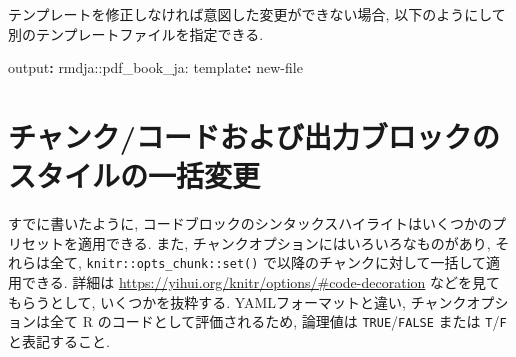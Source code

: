 \documentclass[
]{bxjsbook}
\newenvironment{Shaded}{\begin{snugshade}}{\end{snugshade}}
\newcommand{\AttributeTok}[1]{\textcolor[rgb]{0.77,0.63,0.00}{#1}}
\newcommand{\FunctionTok}[1]{\textcolor[rgb]{0.00,0.00,0.00}{#1}}
\newcommand{\KeywordTok}[1]{\textcolor[rgb]{0.13,0.29,0.53}{\textbf{#1}}}
\providecommand{\tightlist}{%
  \setlength{\itemsep}{0pt}\setlength{\parskip}{0pt}}
\theoremstyle{definition}
\theoremstyle{definition}
\theoremstyle{definition}
\theoremstyle{remark}
\begin{document}
テンプレートを修正しなければ意図した変更ができない場合,
以下のようにして別のテンプレートファイルを指定できる.

\begin{Shaded}
\begin{Highlighting}[]
\FunctionTok{output}\KeywordTok{:}\AttributeTok{ rmdja::pdf\_book\_ja:}
\AttributeTok{  }\FunctionTok{template}\KeywordTok{:}\AttributeTok{ new{-}file}
\end{Highlighting}
\end{Shaded}

\hypertarget{ux30c1ux30e3ux30f3ux30afux30b3ux30fcux30c9ux304aux3088ux3073ux51faux529bux30d6ux30edux30c3ux30afux306eux30b9ux30bfux30a4ux30ebux306eux4e00ux62ecux5909ux66f4}{%
\section{チャンク/コードおよび出力ブロックのスタイルの一括変更}\label{ux30c1ux30e3ux30f3ux30afux30b3ux30fcux30c9ux304aux3088ux3073ux51faux529bux30d6ux30edux30c3ux30afux306eux30b9ux30bfux30a4ux30ebux306eux4e00ux62ecux5909ux66f4}}

すでに書いたように,
コードブロックのシンタックスハイライトはいくつかのプリセットを適用できる.
また, チャンクオプションにはいろいろなものがあり, それらは全て,
\texttt{knitr::opts\_chunk::set()}
で以降のチャンクに対して一括して適用できる. 詳細は
\url{https://yihui.org/knitr/options/\#code-decoration}
などを見てもらうとして, いくつかを抜粋する. YAMLフォーマットと違い,
チャンクオプションは全て R のコードとして評価されるため, 論理値は
\texttt{TRUE}/\texttt{FALSE} または \texttt{T}/\texttt{F}と表記すること.

\end{document}
